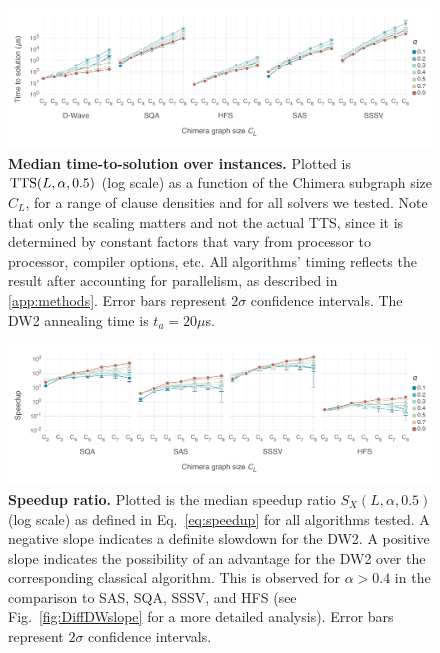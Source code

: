 \begin{figure}[t]
\begin{center}
\includegraphics[width=\textwidth]{chapters/Planted/tts_with_sssv.pdf}
\caption{\textbf{Median time-to-solution over instances.} Plotted is $\textrm{TTS}(L,\alpha,0.5)$ (log scale) as a function of the Chimera subgraph size $C_L$, for a range of clause densities and for all solvers we tested. Note that only the scaling matters and not the actual TTS, since it is determined by constant factors that vary from processor to processor, compiler options, etc.  All algorithms' timing reflects the result after accounting for parallelism, as described in \ref{app:methods}. Error bars represent $2\sigma$ confidence intervals. The DW2 annealing time is $t_a=20\mu$s.  }
\label{fig:TTSscalingbasic50}
\end{center}
\end{figure}

\begin{figure} [t]
\begin{center}
\includegraphics[width=\textwidth]{chapters/Planted/speedup_with_sssv.pdf}
\caption{\textbf{Speedup ratio.} Plotted is the median speedup ratio $S_X(L,\alpha,0.5)$ (log scale) as defined in Eq.~\eqref{eq:speedup} for all algorithms tested. A negative slope indicates a definite slowdown for the DW2. A positive slope indicates the possibility of an advantage for the DW2 over the corresponding classical algorithm. This is observed for $\alpha > 0.4$ in the comparison to SAS, SQA, SSSV, and HFS (see Fig.~\ref{fig:DiffDWslope} for a more detailed analysis). Error bars represent $2\sigma$ confidence intervals. }
\label{fig:Speedupscalingbasic50}
\end{center}
\end{figure}

